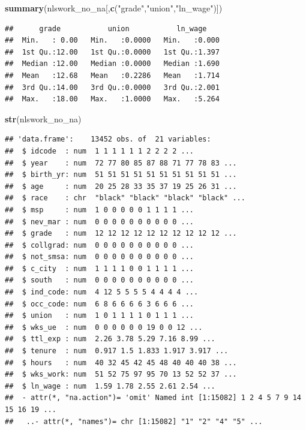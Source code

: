 \documentclass[
]{article}
\newenvironment{Shaded}{\begin{snugshade}}{\end{snugshade}}
\newcommand{\FunctionTok}[1]{\textcolor[rgb]{0.13,0.29,0.53}{\textbf{#1}}}
\newcommand{\NormalTok}[1]{#1}
\newcommand{\StringTok}[1]{\textcolor[rgb]{0.31,0.60,0.02}{#1}}
\begin{document}
\begin{Shaded}
\begin{Highlighting}[]
\FunctionTok{summary}\NormalTok{(nlswork\_no\_na[,}\FunctionTok{c}\NormalTok{(}\StringTok{"grade"}\NormalTok{,}\StringTok{"union"}\NormalTok{,}\StringTok{"ln\_wage"}\NormalTok{)]) }
\end{Highlighting}
\end{Shaded}

\begin{verbatim}
##      grade           union           ln_wage     
##  Min.   : 0.00   Min.   :0.0000   Min.   :0.000  
##  1st Qu.:12.00   1st Qu.:0.0000   1st Qu.:1.397  
##  Median :12.00   Median :0.0000   Median :1.690  
##  Mean   :12.68   Mean   :0.2286   Mean   :1.714  
##  3rd Qu.:14.00   3rd Qu.:0.0000   3rd Qu.:2.001  
##  Max.   :18.00   Max.   :1.0000   Max.   :5.264
\end{verbatim}

\begin{Shaded}
\begin{Highlighting}[]
\FunctionTok{str}\NormalTok{(nlswork\_no\_na) }
\end{Highlighting}
\end{Shaded}

\begin{verbatim}
## 'data.frame':    13452 obs. of  21 variables:
##  $ idcode  : num  1 1 1 1 1 1 2 2 2 2 ...
##  $ year    : num  72 77 80 85 87 88 71 77 78 83 ...
##  $ birth_yr: num  51 51 51 51 51 51 51 51 51 51 ...
##  $ age     : num  20 25 28 33 35 37 19 25 26 31 ...
##  $ race    : chr  "black" "black" "black" "black" ...
##  $ msp     : num  1 0 0 0 0 0 1 1 1 1 ...
##  $ nev_mar : num  0 0 0 0 0 0 0 0 0 0 ...
##  $ grade   : num  12 12 12 12 12 12 12 12 12 12 ...
##  $ collgrad: num  0 0 0 0 0 0 0 0 0 0 ...
##  $ not_smsa: num  0 0 0 0 0 0 0 0 0 0 ...
##  $ c_city  : num  1 1 1 1 0 0 1 1 1 1 ...
##  $ south   : num  0 0 0 0 0 0 0 0 0 0 ...
##  $ ind_code: num  4 12 5 5 5 5 4 4 4 4 ...
##  $ occ_code: num  6 8 6 6 6 6 3 6 6 6 ...
##  $ union   : num  1 0 1 1 1 1 0 1 1 1 ...
##  $ wks_ue  : num  0 0 0 0 0 0 19 0 0 12 ...
##  $ ttl_exp : num  2.26 3.78 5.29 7.16 8.99 ...
##  $ tenure  : num  0.917 1.5 1.833 1.917 3.917 ...
##  $ hours   : num  40 32 45 42 45 48 40 40 40 38 ...
##  $ wks_work: num  51 52 75 97 95 70 13 52 52 37 ...
##  $ ln_wage : num  1.59 1.78 2.55 2.61 2.54 ...
##  - attr(*, "na.action")= 'omit' Named int [1:15082] 1 2 4 5 7 9 14 15 16 19 ...
##   ..- attr(*, "names")= chr [1:15082] "1" "2" "4" "5" ...
\end{verbatim}
\end{document}
